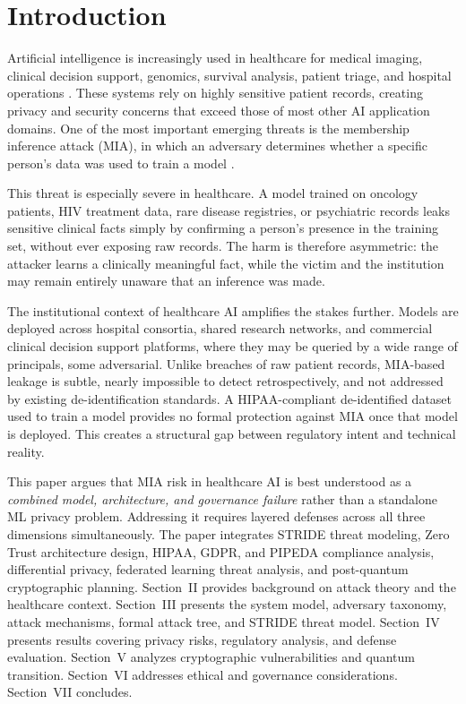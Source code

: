 \documentclass[conference]{IEEEtran}
\begin{document}
	\section{Introduction}
	Artificial intelligence is increasingly used in healthcare for medical imaging, clinical decision support, genomics, survival analysis, patient triage, and hospital operations \cite{shokri2017}. These systems rely on highly sensitive patient records, creating privacy and security concerns that exceed those of most other AI application domains. One of the most important emerging threats is the membership inference attack (MIA), in which an adversary determines whether a specific person's data was used to train a model \cite{shokri2017,yeom2018,nasr2019}.

	This threat is especially severe in healthcare. A model trained on oncology patients, HIV treatment data, rare disease registries, or psychiatric records leaks sensitive clinical facts simply by confirming a person's presence in the training set, without ever exposing raw records. The harm is therefore asymmetric: the attacker learns a clinically meaningful fact, while the victim and the institution may remain entirely unaware that an inference was made.

	The institutional context of healthcare AI amplifies the stakes further. Models are deployed across hospital consortia, shared research networks, and commercial clinical decision support platforms, where they may be queried by a wide range of principals, some adversarial. Unlike breaches of raw patient records, MIA-based leakage is subtle, nearly impossible to detect retrospectively, and not addressed by existing de-identification standards. A HIPAA-compliant de-identified dataset used to train a model provides no formal protection against MIA once that model is deployed. This creates a structural gap between regulatory intent and technical reality.

	This paper argues that MIA risk in healthcare AI is best understood as a \emph{combined model, architecture, and governance failure} rather than a standalone ML privacy problem. Addressing it requires layered defenses across all three dimensions simultaneously. The paper integrates STRIDE threat modeling, Zero Trust architecture design, HIPAA, GDPR, and PIPEDA compliance analysis, differential privacy, federated learning threat analysis, and post-quantum cryptographic planning. Section~II provides background on attack theory and the healthcare context. Section~III presents the system model, adversary taxonomy, attack mechanisms, formal attack tree, and STRIDE threat model. Section~IV presents results covering privacy risks, regulatory analysis, and defense evaluation. Section~V analyzes cryptographic vulnerabilities and quantum transition. Section~VI addresses ethical and governance considerations. Section~VII concludes.
\end{document}
